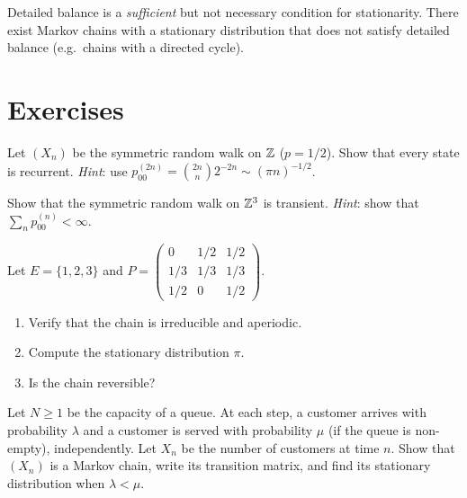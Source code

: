 \begin{attention}[title=\textbf{Detailed balance $\neq$ stationarity}]
Detailed balance is a \emph{sufficient} but not necessary condition for stationarity.
There exist Markov chains with a stationary distribution that does not satisfy detailed
balance (e.g.\ chains with a directed cycle).
\end{attention}

\section{Exercises}

\begin{exercise}
Let $(X_n)$ be the symmetric random walk on $\mathbb{Z}$ ($p = 1/2$). Show that every state
is recurrent.
\emph{Hint}: use $p_{00}^{(2n)} = \binom{2n}{n} 2^{-2n} \sim (\pi n)^{-1/2}$.
\end{exercise}

\begin{exercise}
Show that the symmetric random walk on $\mathbb{Z}^3$ is transient.
\emph{Hint}: show that $\sum_n p_{00}^{(n)} < \infty$.
\end{exercise}

\begin{exercise}
Let $E = \{1, 2, 3\}$ and
$P = \begin{pmatrix} 0 & 1/2 & 1/2 \\ 1/3 & 1/3 & 1/3 \\ 1/2 & 0 & 1/2 \end{pmatrix}$.
\begin{enumerate}
    \item Verify that the chain is irreducible and aperiodic.
    \item Compute the stationary distribution $\pi$.
    \item Is the chain reversible?
\end{enumerate}
\end{exercise}

\begin{exercise}
Let $N \geq 1$ be the capacity of a queue. At each step, a customer arrives with
probability $\lambda$ and a customer is served with probability $\mu$ (if the queue
is non-empty), independently. Let $X_n$ be the number of customers at time $n$.
Show that $(X_n)$ is a Markov chain, write its transition matrix, and find its
stationary distribution when $\lambda < \mu$.
\end{exercise}

